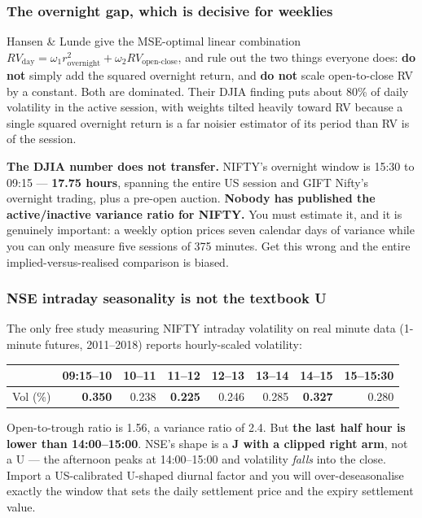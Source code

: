 \documentclass[11pt,a4paper]{article}
\begin{document}
\subsubsection{The overnight gap, which is decisive for weeklies}

Hansen \& Lunde give the MSE-optimal linear combination
$RV_{\text{day}} = \omega_1 r^2_{\text{overnight}} + \omega_2 RV_{\text{open-close}}$,
and rule out the two things everyone does: \textbf{do not} simply add the squared
overnight return, and \textbf{do not} scale open-to-close RV by a constant. Both
are dominated. Their DJIA finding puts about 80\% of daily volatility in the
active session, with weights tilted heavily toward RV because a single squared
overnight return is a far noisier estimator of its period than RV is of the session.

\textbf{The DJIA number does not transfer.} NIFTY's overnight window is 15:30 to
09:15 --- \textbf{17.75 hours}, spanning the entire US session and GIFT Nifty's
overnight trading, plus a pre-open auction. \textbf{Nobody has published the
active/inactive variance ratio for NIFTY.} You must estimate it, and it is
genuinely important: a weekly option prices seven calendar days of variance while
you can only measure five sessions of 375 minutes. Get this wrong and the entire
implied-versus-realised comparison is biased.

\subsubsection{NSE intraday seasonality is not the textbook U}

The only free study measuring NIFTY intraday volatility on real minute data
(1-minute futures, 2011--2018) reports hourly-scaled volatility:

\begin{center}
\small
\begin{tabular}{@{}lrrrrrrr@{}}
\toprule
& 09:15--10 & 10--11 & 11--12 & 12--13 & 13--14 & 14--15 & 15--15:30 \\
\midrule
Vol (\%) & \textbf{0.350} & 0.238 & \textbf{0.225} & 0.246 & 0.285 & \textbf{0.327} & 0.280 \\
\bottomrule
\end{tabular}
\end{center}

Open-to-trough ratio is 1.56, a variance ratio of 2.4. But \textbf{the last half
hour is lower than 14:00--15:00}. NSE's shape is a \textbf{J with a clipped right
arm}, not a U --- the afternoon peaks at 14:00--15:00 and volatility \emph{falls}
into the close. Import a US-calibrated U-shaped diurnal factor and you will
over-deseasonalise exactly the window that sets the daily settlement price and the
expiry settlement value.
\end{document}
